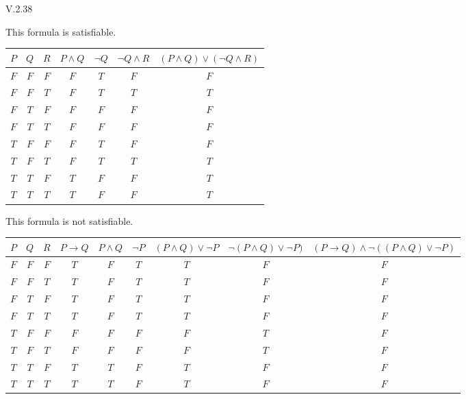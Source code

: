 \begin{ans}{V.2.38}
\begin{exparts}
\item This formula is satisfiable.
\begin{center} %
\small
\begin{tabular}{ccc|ccc|c}
  $P$  &$Q$  &$R$  &$P\wedge Q$ &$\neg Q$ &$\neg Q\wedge R$ &$(P\wedge Q)\vee(\neg Q\wedge R)$ \\ \hline
  $F$  &$F$  &$F$  &$F$ &$T$ &$F$ &$F$ \\
  $F$  &$F$  &$T$  &$F$ &$T$ &$T$ &$T$ \\
  $F$  &$T$  &$F$  &$F$ &$F$ &$F$ &$F$ \\
  $F$  &$T$  &$T$  &$F$ &$F$ &$F$ &$F$ \\[1ex]
  $T$  &$F$  &$F$  &$F$ &$T$ &$F$ &$F$ \\
  $T$  &$F$  &$T$  &$F$ &$T$ &$T$ &$T$ \\
  $T$  &$T$  &$F$  &$T$ &$F$ &$F$ &$T$ \\
  $T$  &$T$  &$T$  &$T$ &$F$ &$F$ &$T$
\end{tabular}
\end{center}
\item This formula is not satisfiable.
\begin{center} %
\small
\begin{tabular}{ccc|ccccc|c}
  $P$  &$Q$  &$R$  &$P\to Q$ &$P\wedge Q$ &$\neg P$ &$(P\wedge Q)\vee \neg P$ &$\neg(P\wedge Q)\vee \neg P)$  &$(P\to Q)\wedge \neg((P\wedge Q)\vee \neg P)$  \\ \hline
  $F$  &$F$  &$F$  &$T$ &$F$ &$T$ &$T$  &$F$  &$F$ \\
  $F$  &$F$  &$T$  &$T$ &$F$ &$T$ &$T$  &$F$  &$F$ \\
  $F$  &$T$  &$F$  &$T$ &$F$ &$T$ &$T$  &$F$  &$F$ \\
  $F$  &$T$  &$T$  &$T$ &$F$ &$T$ &$T$  &$F$  &$F$ \\[1ex]
  $T$  &$F$  &$F$  &$F$ &$F$ &$F$ &$F$  &$T$  &$F$ \\
  $T$  &$F$  &$T$  &$F$ &$F$ &$F$ &$F$  &$T$  &$F$ \\
  $T$  &$T$  &$F$  &$T$ &$T$ &$F$ &$T$  &$F$  &$F$ \\
  $T$  &$T$  &$T$  &$T$ &$T$ &$F$ &$T$  &$F$  &$F$
\end{tabular}
\end{center}
\end{exparts}
\end{ans}
